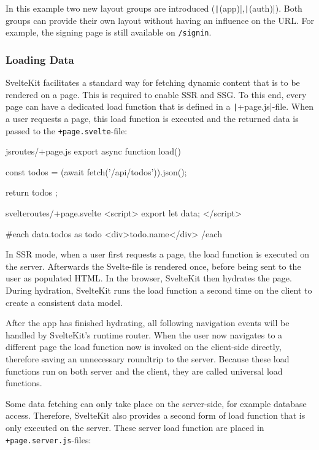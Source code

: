 In this example two new layout groups are introduced (\texttt|(app)|,\texttt|(auth)|). Both groups can provide their own layout without having an influence on the URL. For example, the signing page is still available on \texttt{/signin}.

\subsubsection{Loading Data}
\label{sec:sveltekit-loading}

SvelteKit facilitates a standard way for fetching dynamic content that is to be rendered on a page. This is required to enable SSR and SSG. To this end, every page can have a dedicated load function that is defined in a \texttt|+page.js|-file. When a user requests a page, this load function is executed and the returned data is passed to the \texttt{+page.svelte}-file:

\begin{myminted}{js}{routes/+page.js}
export async function load() {
  const todos = (await fetch('/api/todos')).json();

  return { todos };
}
\end{myminted}
\begin{myminted}{svelte}{routes/+page.svelte}
<script>
  export let data;
</script>

{#each data.todos as todo}
  <div>{todo.name}</div>
{/each}
\end{myminted}

In SSR mode, when a user first requests a page, the load function is executed on the server. Afterwards the Svelte-file is rendered once, before being sent to the user as populated HTML. In the browser, SvelteKit then hydrates the page. During hydration, SvelteKit runs the load function a second time on the client to create a consistent data model.

After the app has finished hydrating, all following navigation events will be handled by SvelteKit's runtime router. When the user now navigates to a different page the load function now is invoked on the client-side directly, therefore saving an unnecessary roundtrip to the server. Because these load functions run on both server and the client, they are called universal load functions.

Some data fetching can only take place on the server-side, for example database access. Therefore, SvelteKit also provides a second form of load function that is only executed on the server. These server load function are placed in \texttt{+page.server.js}-files:

